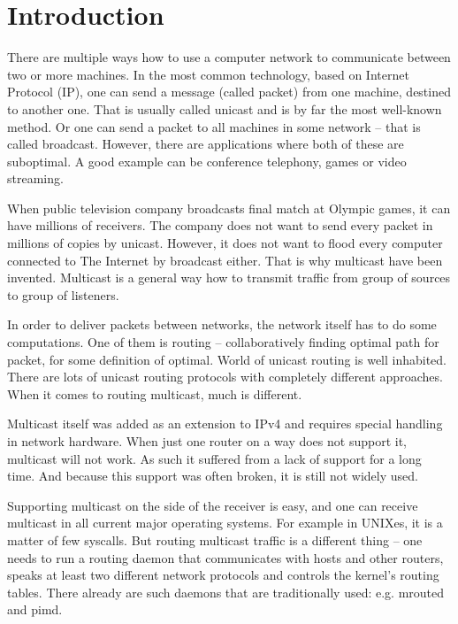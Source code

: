 \chapter*{Introduction}


There are multiple ways how to use a computer network to communicate between two
or more machines. In the most common technology, based on Internet Protocol
(IP), one can send a message (called packet) from one machine, destined to
another one. That is usually called unicast and is by far the most well-known
method. Or one can send a packet to all machines in some network -- that is
called broadcast. However, there are applications where both of these
are suboptimal. A good example can be conference telephony, games or video
streaming.

When public television company broadcasts final match at Olympic games, it can
have millions of receivers. The company does not want to send every packet in
millions of copies by unicast. However, it does not want to flood every
computer connected to The Internet by broadcast either. That is why multicast have
been invented. Multicast is a general way how to transmit traffic from group of
sources to group of listeners.

In order to deliver packets between networks, the network itself has to do some
computations. One of them is routing -- collaboratively finding optimal path
for packet, for some definition of optimal.
World of unicast routing is well inhabited. There are lots of unicast routing
protocols with completely different approaches. When it comes to routing
multicast, much is different.

Multicast itself was added as an extension to IPv4 and requires special
handling in network hardware. When just one router on a way does not support
it, multicast will not work. As such it suffered from a lack of support for a long
time. And because this support was often broken, it is still not widely used.

Supporting multicast on the side of the receiver is easy, and one can receive
multicast in all current major operating systems. For example in UNIXes, it is
a matter of few syscalls. But routing multicast traffic is a different thing
-- one needs to run a routing daemon that communicates with hosts and other
routers, speaks at least two different network protocols and controls the
kernel's routing tables. There already are such daemons that are traditionally
used: e.g. mrouted and pimd.

